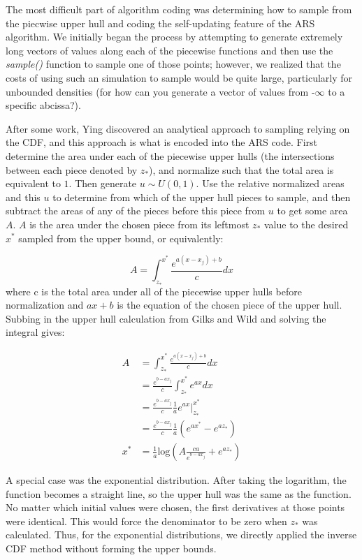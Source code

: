\documentclass{article}
\begin{document}
The most difficult part of algorithm coding was determining how to sample from the piecwise upper hull and coding the self-updating feature of the ARS algorithm.  We initially began the process by attempting to generate extremely long vectors of values along each of the piecewise functions and then use the \textit{sample()} function to sample one of those points; however, we realized that the costs of using such an simulation to sample would be quite large, particularly for unbounded densities (for how can you generate a vector of values from -$\infty$ to a specific abcissa?).  

After some work, Ying discovered an analytical approach to sampling relying on the CDF, and this approach is what is encoded into the ARS code.  First determine the area under each of the piecewise upper hulls (the intersections between each piece denoted by $z_*$), and normalize such that the total area is equivalent to $1$.  Then generate $u\sim U\left(0, 1\right)$.  Use the relative normalized areas and this $u$ to determine from which of the upper hull pieces to sample, and then subtract the areas of any of the pieces before this piece from $u$ to get some area $A$.  $A$ is the area under the chosen piece from its leftmost $z_*$ value to the desired $x^*$ sampled from the upper bound, or equivalently:

$$A= \int_{z_*}^{x^*}\frac{e^{a\left(x-x_j\right)+b}}{c}dx$$
where c is the total area under all of the piecewise upper hulls before normalization and $ax+b$ is the equation of the chosen piece of the upper hull.  Subbing in the upper hull calculation from Gilks and Wild and solving the integral gives:

\begin{align*}
A &= \int_{z_*}^{x^*}\frac{e^{a\left(x-x_j\right)+b}}{c}dx\\
&= \frac{e^{b-ax_j}}{c}\int_{z_*}^{x^*}e^{ax}dx\\
&= \frac{e^{b-ax_j}}{c}\frac{1}{a}\left.e^{ax}\right|_{z_*}^{x^*}\\
&= \frac{e^{b-ax_j}}{c}\frac{1}{a}\left(e^{ax^*} - e^{az_*}\right)\\
x^* &= \frac{1}{a}\text{log}\left(A\frac{ca}{e^{b-ax_j}}+e^{az_*}\right)
\end{align*}

A special case was the exponential distribution. After taking the logarithm, the function becomes a straight line, so the upper hull was the same as the function. No matter which initial values were chosen, the first derivatives at those points were identical. This would force the denominator to be zero when $z_*$ was calculated. Thus,  for the exponential distributions, we directly applied the inverse CDF method without forming the upper bounds.
\end{document}

